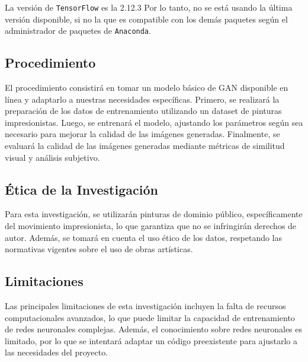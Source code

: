\documentclass[../main.tex]{subfiles}
\begin{document}
La versión de \texttt{TensorFlow} es la 2.12.3 Por lo tanto, no se está usando la última versión disponible, si no la que es compatible con los demás paquetes según el administrador de paquetes de \texttt{Anaconda}.

\subsection{Procedimiento}
El procedimiento consistirá en tomar un modelo básico de GAN disponible en línea y adaptarlo a nuestras necesidades específicas. Primero, se realizará la preparación de los datos de entrenamiento utilizando un dataset de pinturas impresionistas. Luego, se entrenará el modelo, ajustando los parámetros según sea necesario para mejorar la calidad de las imágenes generadas. Finalmente, se evaluará la calidad de las imágenes generadas mediante métricas de similitud visual y análisis subjetivo.

\subsection{Ética de la Investigación}
Para esta investigación, se utilizarán pinturas de dominio público, específicamente del movimiento impresionista, lo que garantiza que no se infringirán derechos de autor. Además, se tomará en cuenta el uso ético de los datos, respetando las normativas vigentes sobre el uso de obras artísticas.

\subsection{Limitaciones}
Las principales limitaciones de esta investigación incluyen la falta de recursos computacionales avanzados, lo que puede limitar la capacidad de entrenamiento de redes neuronales complejas. Además, el conocimiento sobre redes neuronales es limitado, por lo que se intentará adaptar un código preexistente para ajustarlo a las necesidades del proyecto.
\end{document}
